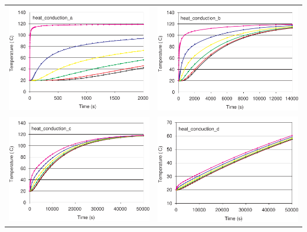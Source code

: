 \documentclass[11pt]{book}
\begin{document}
\noindent
\begin{tabular*}{\textwidth}{lr}
\includegraphics[width=3.2in]{FIGURES/heat_conduction_Slab_A_Temperatures} &
\includegraphics[width=3.2in]{FIGURES/heat_conduction_Slab_B_Temperatures} \\
\includegraphics[width=3.2in]{FIGURES/heat_conduction_Slab_C_Temperatures} &
\includegraphics[width=3.2in]{FIGURES/heat_conduction_Slab_D_Temperatures}
\end{tabular*}
\end{document}
